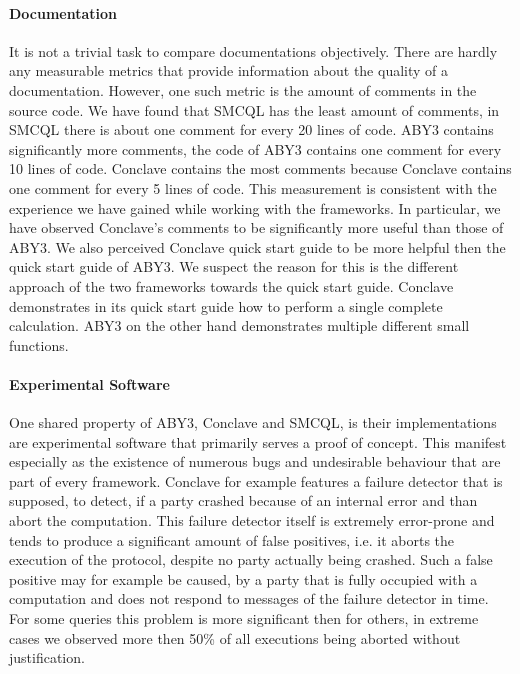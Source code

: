 \paragraph{Documentation}
It is not a trivial task to compare documentations objectively. There are hardly any measurable metrics that provide information about the quality of a documentation. However, one such metric is the amount of comments in the source code. We have found that SMCQL has the least amount of comments, in SMCQL there is about one comment for every 20 lines of code. ABY3 contains significantly more comments, the code of ABY3 contains one comment for every 10 lines of code. Conclave contains the most comments because Conclave contains one comment for every 5 lines of code. This measurement is consistent with the experience we have gained while working with the frameworks. In particular, we have observed Conclave's comments to be significantly more useful than those of ABY3. %
We also perceived Conclave quick start guide to be more helpful then the quick start guide of ABY3. We suspect the reason for this is the different approach of the two frameworks towards the quick start guide. Conclave demonstrates in its quick start guide how to perform a single complete calculation. ABY3 on the other hand demonstrates multiple different small functions.  

\paragraph{Experimental Software}
One shared property of ABY3, Conclave and SMCQL, is their implementations are experimental software that primarily serves a proof of concept. This manifest especially as the existence of numerous bugs and undesirable behaviour that are part of every framework. Conclave for example features a failure detector that is supposed, to detect, if a party crashed because of an  internal error and than abort the computation. This failure detector itself is extremely error-prone and tends to produce a significant amount of false positives, i.e. it aborts the execution of the protocol, despite no party actually being crashed. Such a false positive may for example be caused, by a party that is fully occupied with a computation and does not respond to messages of the failure detector in time. For some queries this problem is more significant then for others, in extreme cases we observed more then 50\% of all executions being aborted without justification. %



